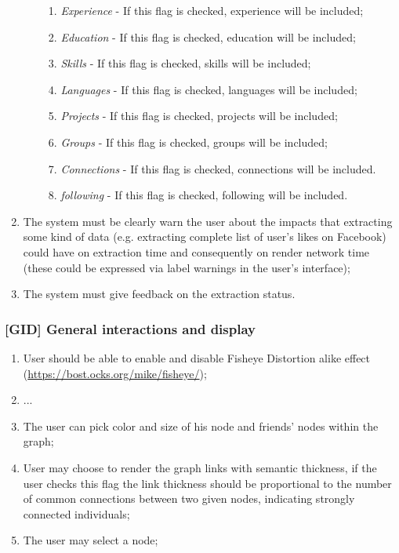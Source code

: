 \begin{enumerate}
\begin{enumerate}
        \begin{enumerate}
            \item \textit{Experience} - If this flag is checked, experience will be included;
            \item \textit{Education} - If this flag is checked, education will be included;
            \item \textit{Skills} - If this flag is checked, skills will be included;
            \item \textit{Languages} - If this flag is checked, languages will be included;
            \item \textit{Projects} - If this flag is checked, projects will be included;
            \item \textit{Groups} - If this flag is checked, groups will be included;
            \item \textit{Connections} - If this flag is checked, connections will be included.
            \item \textit{following} - If this flag is checked, following will be included.
        \end{enumerate}
    \end{enumerate}
    \item The system must be clearly warn the user about the impacts that extracting some kind of data (e.g. extracting complete list of user's likes on Facebook)
    could have on extraction time and consequently on render network time (these could be expressed via label warnings in the user's interface);
    \item The system must give feedback on the extraction status.
\end{enumerate}

\subsubsection*{\textbf{[GID] General interactions and display}}
\begin{enumerate}
    \item User should be able to enable and disable Fisheye Distortion alike effect (\url{https://bost.ocks.org/mike/fisheye/});
    \item ...
    \item The user can pick color and size of his node and friends' nodes within the graph;
    \item User may choose to render the graph links with semantic thickness, if the user checks this flag the link thickness should be
    proportional to the number of common connections between two given nodes, indicating strongly connected individuals;


    \item The user may select a node;
\end{enumerate}


